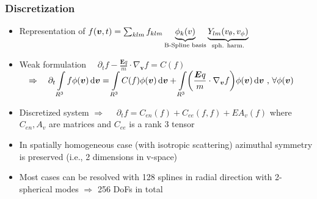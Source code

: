 \documentclass[mathserif, aspectratio=169]{beamer}
\newcommand{\ud}{\,\mathrm{d}}
\newcommand{\vect}[1]{\boldsymbol{#1}}
\newcommand{\of}[1]{\mleft( #1 \mright)}
\newcommand{\myint}{\int\limits}
\newcommand{\diff}[1]{\, d#1}
\begin{document}
\begin{frame}
	\frametitle{Discretization}
	\small
	\begin{itemize}
		\item Representation of $f\of{\vect{v},t} = \sum_{klm} f_{klm} \underbrace{\phi_k\of{v}}_{\text{B-Spline basis}} \underbrace{Y_{lm}\of{v_\theta, v_\phi}}_{\tiny\text{sph. harm.}}$ 
		\item Weak formulation
		$
		\displaystyle
		\quad
		\partial_t f - \frac{\vect{E} q}{m} \cdot \nabla_{\vect{v}}f = C(f)
		\quad $ \\
		$
		\displaystyle
		\quad
		\Rightarrow \quad
		\partial_t \myint_{R^3} f \phi\of{\vect{v}} \ud \vect{v} = 
		\myint_{R^3} C(f) \phi\of{\vect{v}} \ud \vect{v} + \myint_{R^3} \of{\frac{\vect{E} q}{m} \cdot \nabla_{\vect{v}} f} \phi(\vect{v}) \ud \vect{v}\text{ , } 
		\forall \phi(\vect{v})$
		\item Discretized system $\Rightarrow$
		$
		\displaystyle
		\quad
		\partial_t f  = C_{en}(f) + C_{ee}(f,f) + E A_v (f)
		$ where $C_{en}, A_v$ are matrices and $C_{ee}$ is a rank 3 tensor\\
		\item In spatially homogeneous case (with isotropic scattering) azimuthal symmetry is preserved (i.e., 2 dimensions in v-space)
		\item Most cases can be resolved with 128 splines in radial direction with 2-spherical modes $\Rightarrow$ 256 DoFs in total
	\end{itemize}
\end{frame}
\end{document}

